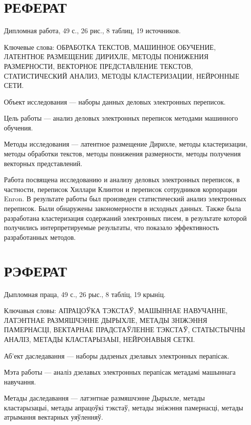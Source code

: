 \chapter*{РЕФЕРАТ}

Дипломная работа, 49 с., 26 рис., 8 таблиц, 19 источников.

Ключевые слова: ОБРАБОТКА ТЕКСТОВ, МАШИННОЕ ОБУЧЕНИЕ, ЛАТЕНТНОЕ РАЗМЕЩЕНИЕ ДИРИХЛЕ, МЕТОДЫ ПОНИЖЕНИЯ РАЗМЕРНОСТИ, ВЕКТОРНОЕ ПРЕДСТАВЛЕНИЕ ТЕКСТОВ, СТАТИСТИЧЕСКИЙ АНАЛИЗ, МЕТОДЫ КЛАСТЕРИЗАЦИИ, НЕЙРОННЫЕ СЕТИ.

\vspace{1.5 ex}
Объект исследования --- наборы данных деловых электронных переписок. 

Цель работы --- анализ деловых электронных переписок методами машинного обучения.

Методы исследования --- латентное размещение Дирихле, методы кластеризации, методы обработки текстов, методы понижения размерности, методы получения векторных представлений.

Работа посвящена исследованию и анализу деловых электронных переписок, в частности, переписок Хиллари Клинтон и переписок сотрудников корпорации Enron. В результате работы был произведен статистический анализ электронных переписок. Были обнаружены закономерности в исходных данных. Также была разработана кластеризация содержаний электронных писем, в результате которой получились интерпретируемые результаты, что показало эффективность разработанных методов.
 


\chapter*{РЭФЕРАТ}

Дыпломная праца, 49 с., 26 рыс., 8 табліц, 19 крыніц.

Ключавыя словы: АПРАЦОЎКА ТЭКСТАЎ, МАШЫННАЕ НАВУЧАННЕ, ЛАТЭНТНАЕ РАЗМЯШЧЭННЕ ДЫРЫХЛЕ, МЕТАДЫ ЗНІЖЭННЯ ПАМЕРНАСЦІ, ВЕКТАРНАЕ ПРАДСТАЎЛЕННЕ ТЭКСТАЎ, СТАТЫСТЫЧНЫ АНАЛІЗ, МЕТАДЫ КЛАСТАРЫЗАЫІ, НЕЙРОНАВЫЯ СЕТКІ.

Аб'ект даследавання --- наборы дадзеных дзелавых электронных перапісак.

Мэта работы --- аналіз дзелавых электронных перапісак метадамі машыннага навучання.

Метады даследавання --- латэнтнае размяшчэнне Дырыхле, метады кластарызацыі, метады апрацоўкі тэкстаў, метады зніжэння памернасці, метады атрымання вектарных уяўленняў.

